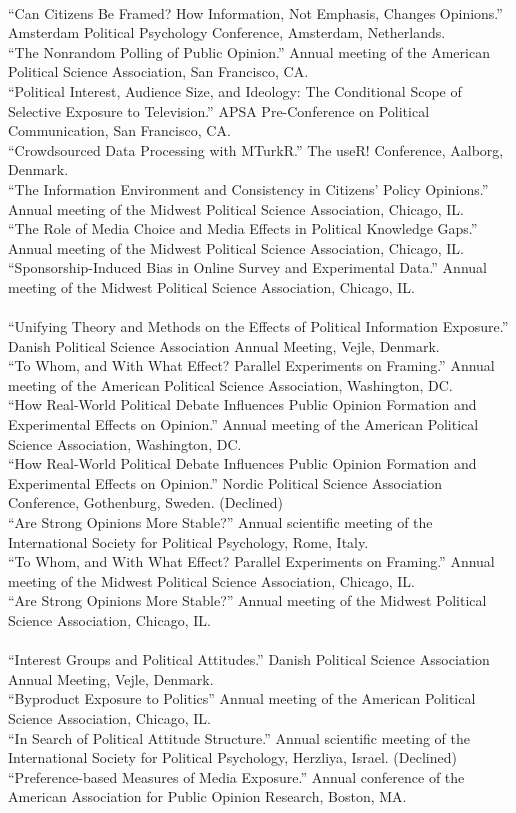 \documentclass[12pt]{article}
\newcommand{\topic}[1]{\pagebreak[3]\indent {\color{lg}{\footnotesize #1 }}\\}
\newcommand{\entry}[1]{\indent {\color{lg}\guillemotright}\hspace{2pt}#1\vspace{.25em}\\}
\begin{document}
{	\topic{Conference Papers (2015)}
	\entry{``Can Citizens Be Framed? How Information, Not Emphasis, Changes Opinions.'' Amsterdam Political Psychology Conference, Amsterdam, Netherlands.}
	\entry{``The Nonrandom Polling of Public Opinion.'' Annual meeting of the American Political Science Association, San Francisco, CA.}
	\entry{``Political Interest, Audience Size, and Ideology: The Conditional Scope of Selective Exposure to Television.'' APSA Pre-Conference on Political Communication, San Francisco, CA.}
	\entry{``Crowdsourced Data Processing with MTurkR.'' The useR! Conference, Aalborg, Denmark.}
	\entry{``The Information Environment and Consistency in Citizens' Policy Opinions.'' Annual meeting of the Midwest Political Science Association, Chicago, IL.}
	\entry{``The Role of Media Choice and Media Effects in Political Knowledge Gaps.'' Annual meeting of the Midwest Political Science Association, Chicago, IL.}
	\entry{``Sponsorship-Induced Bias in Online Survey and Experimental Data.'' Annual meeting of the Midwest Political Science Association, Chicago, IL.}
	
	\topic{Conference Papers (2014)}
	\entry{``Unifying Theory and Methods on the Effects of Political Information Exposure.'' Danish Political Science Association Annual Meeting, Vejle, Denmark.}
	\entry{``To Whom, and With What Effect? Parallel Experiments on Framing.'' Annual meeting of the American Political Science Association, Washington, DC.}
	\entry{``How Real-World Political Debate Influences Public Opinion Formation and Experimental Effects on Opinion.'' Annual meeting of the American Political Science Association, Washington, DC.}
	\entry{``How Real-World Political Debate Influences Public Opinion Formation and Experimental Effects on Opinion.'' Nordic Political Science Association Conference, Gothenburg, Sweden. (Declined)}
	\entry{``Are Strong Opinions More Stable?'' Annual scientific meeting of the International Society for Political Psychology, Rome, Italy.}
	\entry{``To Whom, and With What Effect? Parallel Experiments on Framing.'' Annual meeting of the Midwest Political Science Association, Chicago, IL.}
	\entry{``Are Strong Opinions More Stable?'' Annual meeting of the Midwest Political Science Association, Chicago, IL.}
	
	\topic{Conference Papers (2013)}
	\entry{``Interest Groups and Political Attitudes.'' Danish Political Science Association Annual Meeting, Vejle, Denmark.}
	\entry{``Byproduct Exposure to Politics'' Annual meeting of the American Political Science Association, Chicago, IL.}
	\entry{``In Search of Political Attitude Structure.'' Annual scientific meeting of the International Society for Political Psychology, Herzliya, Israel. (Declined)}
	\entry{``Preference-based Measures of Media Exposure.'' Annual conference of the American Association for Public Opinion Research, Boston, MA.}
	
}
\end{document}

